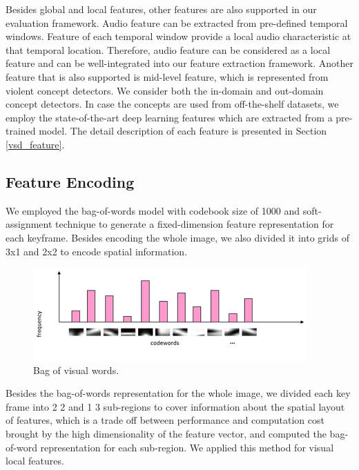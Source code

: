 \documentclass[review]{elsarticle}
\begin{document}
Besides global and local features, other features are also supported in our evaluation framework. Audio feature can be extracted from pre-defined temporal windows. Feature of each temporal window provide a local audio characteristic at that temporal location. Therefore, audio feature can be considered as a local feature and can be well-integrated into our feature extraction framework. Another feature that is also supported is mid-level feature, which is represented from violent concept detectors. We consider both the in-domain and out-domain concept detectors. In case the concepts are used from off-the-shelf datasets, we employ the state-of-the-art deep learning features which are extracted from a pre-trained model. The detail description of each feature is presented in Section \ref{vsd_feature}.

\subsection{Feature Encoding}
\label{feature_encoding}


We employed the bag-of-words model with codebook size of 1000 and soft-assignment technique to generate a fixed-dimension feature representation for each keyframe. Besides encoding the whole image, we also divided it into grids of 3x1 and 2x2 to encode spatial information.
\begin{figure}[!h]
	\centering
	\includegraphics[width=0.7\linewidth]{Images/Bow.png}
	\caption{Bag of visual words.}
	\label{fig:bow}
\end{figure}
Besides the bag-of-words representation for the whole image, we divided each key frame into 2  2 and 1  3 sub-regions to cover information about the spatial layout of features, which is a trade off between performance and computation cost brought by the high dimensionality of the feature vector, and computed the bag-of-word representation for each sub-region. We applied this method for visual local features.
\end{document}
